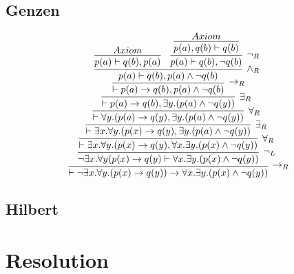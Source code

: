 \documentclass[]{article}
\begin{document}
\subsection{Genzen}
$$
\infer[\rightarrow_R]{\vdash\neg\exists x.\forall y.(p(x)\rightarrow q(y))\rightarrow\forall x. \exists y.(p(x)\wedge \neg q(y))}{
\infer[\neg_L]{\neg \exists x.\forall y(p(x)\rightarrow q(y)\vdash \forall x.\exists y.(p(x)\wedge \neg q(y))}{
\infer[\forall_R]{\vdash \exists x.\forall y.(p(x)\rightarrow q(y), \forall x.\exists y.(p(x)\wedge \neg q(y))}{
\infer[\exists_R]{\vdash \exists x.\forall y.(p(x)\rightarrow q(y), \exists y.(p(a)\wedge \neg q(y))}{
\infer[\forall_R]{\vdash \forall y.(p(a)\rightarrow q(y), \exists y.(p(a)\wedge \neg q(y))}{
\infer[\exists_R]{\vdash p(a)\rightarrow q(b), \exists y.(p(a)\wedge \neg q(y))}{
\infer[\rightarrow_R]{\vdash p(a)\rightarrow q(b), p(a)\wedge \neg q(b)}{
	\infer[\wedge_R]{p(a)\vdash q(b),p(a)\wedge\neg q(b)}{
		\infer{p(a)\vdash q(b),p(a)}{Axiom}
		&
		\infer[\neg_R]{p(a)\vdash q(b),\neg q(b)}{
			\infer{p(a),q(b)\vdash q(b)}{Axiom}
		}
	}
}
}}}}}}
$$
\subsection{Hilbert}
\section{Resolution}
\end{document}
